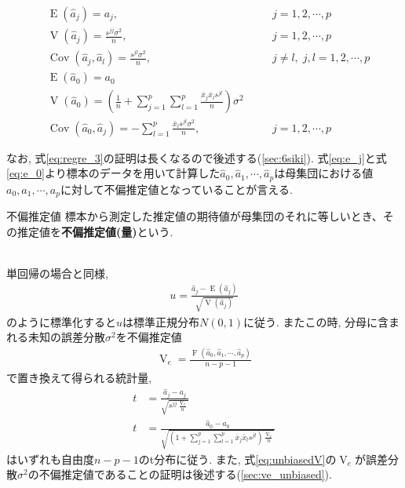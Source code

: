 \begin{subequations}
  \label{eq:regre_3}
  \begin{alignat}{2}
    \label{eq:e_j} %
    &\operatorname{E}(\hat{a}_j) = a_j, &  &j=1, 2, \cdots, p \\
    \label{eq:v_j} %
    &\operatorname{V}(\hat{a}_j) = \frac{s^{jj}\sigma^2}{n},& &j=1, 2, \cdots, p \\
    \label{eq:cov_jl} %
    &\operatorname{Cov}(\hat{a}_j, \hat{a}_l) =\frac{s^{jl}\sigma^2}{n},& &j\neq l,\; j, l=1, 2, \cdots, p\\
    \label{eq:e_0} %
    &\operatorname{E}(\hat{a}_0)=a_0 \\
    \label{eq:v_0} %
    &\operatorname{V}(\hat{a}_0) = \left(\frac{1}{n}+\sum_{j=1}^p\sum_{l=1}^p\frac{\bar{x}_j\bar{x}_ls^{jl}}{n}\right)\sigma^2 \\
    \label{eq:cov_0j} %
    &\operatorname{Cov}(\hat{a}_0, \hat{a}_j) = -\sum_{l=1}^p\frac{\bar{x}_ls^{jl}\sigma^2}{n},&\quad & j=1, 2, \cdots, p 
  \end{alignat}
\end{subequations}

なお, 式\eqref{eq:regre_3}の証明は長くなるので後述する(\ref{sec:6siki}). 式\eqref{eq:e_j}と式\eqref{eq:e_0}より標本のデータを用いて計算した$\hat{a}_0, \hat{a}_1, \cdots, \hat{a}_p$は母集団における値$a_0, a_1, \cdots, a_p$に対して不偏推定値となっていることが言える. 

\begin{itembox}[l]{不偏推定値}
  \quad 標本から測定した推定値の期待値が母集団のそれに等しいとき、その推定値を{\bf 不偏推定値(量)}という.  
\end{itembox} \\

単回帰の場合と同様, 
\begin{align}
  \label{eq:norm_s}
  u = \frac{\hat{a}_j-\operatorname{E}(\hat{a}_j)}{\sqrt{\operatorname{V}(\hat{a}_j)}}
\end{align}
のように標準化すると$u$は標準正規分布$N(0, 1)$に従う. またこの時, 分母に含まれる未知の誤差分散$\sigma^2$を不偏推定値
\begin{align}
  \label{eq:unbiasedV} %
  \operatorname{V}_e = \frac{\operatorname{F}(\hat{a}_0, \hat{a}_1, \cdots, \hat{a}_p)}{n-p-1}
\end{align}
で置き換えて得られる統計量, 
\begin{align}
  \label{eq:stat_j}
  t &= \frac{\hat{a}_j-a_j}{\sqrt{s^{jj}\frac{\operatorname{V}_e}{n}}} \\
  \label{eq:stat_0}
  t &= \frac{\hat{a}_0-a_0}{\sqrt{\left(1+\sum_{j=1}^p\sum_{l=1}^p\bar{x}_j\bar{x}_ls^{jl}\right)\frac{\operatorname{V}_e}{n}}}
\end{align}
はいずれも自由度$n-p-1$のt分布に従う. また, 式\eqref{eq:unbiasedV}の$\operatorname{V}_e$が誤差分散$\sigma^2$の不偏推定値であることの証明は後述する(\ref{sec:ve_unbiased}).

